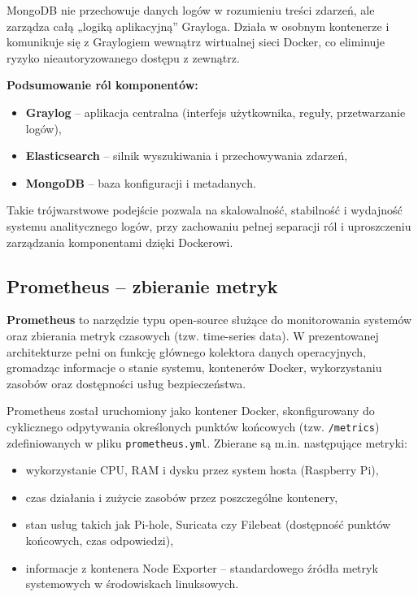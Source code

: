\documentclass[
    left=2.5cm,         %
    right=2.5cm,        %
    top=2.5cm,          %
    bottom=3cm,         %
    bindingoffset=6mm,  %
    nohyphenation=true %
]{eiti/eiti-thesis} %
\begin{document}
MongoDB nie przechowuje danych logów w rozumieniu treści zdarzeń, ale zarządza całą „logiką aplikacyjną” Grayloga. Działa w osobnym kontenerze i komunikuje się z Graylogiem wewnątrz wirtualnej sieci Docker, co eliminuje ryzyko nieautoryzowanego dostępu z zewnątrz.

\textbf{Podsumowanie ról komponentów:}
\begin{itemize}
    \item \textbf{Graylog} – aplikacja centralna (interfejs użytkownika, reguły, przetwarzanie logów),
    \item \textbf{Elasticsearch} – silnik wyszukiwania i przechowywania zdarzeń,
    \item \textbf{MongoDB} – baza konfiguracji i metadanych.
\end{itemize}

Takie trójwarstwowe podejście pozwala na skalowalność, stabilność i wydajność systemu analitycznego logów, przy zachowaniu pełnej separacji ról i uproszczeniu zarządzania komponentami dzięki Dockerowi.

\subsection{Prometheus – zbieranie metryk}

\textbf{Prometheus}\cite{prometheus-docs} to narzędzie typu open-source służące do monitorowania systemów oraz zbierania metryk czasowych (tzw. time-series data). W prezentowanej architekturze pełni on funkcję głównego kolektora danych operacyjnych, gromadząc informacje o stanie systemu, kontenerów Docker, wykorzystaniu zasobów oraz dostępności usług bezpieczeństwa.

Prometheus został uruchomiony jako kontener Docker, skonfigurowany do cyklicznego odpytywania określonych punktów końcowych (tzw. \texttt{/metrics}) zdefiniowanych w pliku \texttt{prometheus.yml}. Zbierane są m.in. następujące metryki:
\begin{itemize}
    \item wykorzystanie CPU, RAM i dysku przez system hosta (Raspberry Pi),
    \item czas działania i zużycie zasobów przez poszczególne kontenery,
    \item stan usług takich jak Pi-hole, Suricata czy Filebeat (dostępność punktów końcowych, czas odpowiedzi),
    \item informacje z kontenera Node Exporter – standardowego źródła metryk systemowych w środowiskach linuksowych.
\end{itemize}
\end{document}
